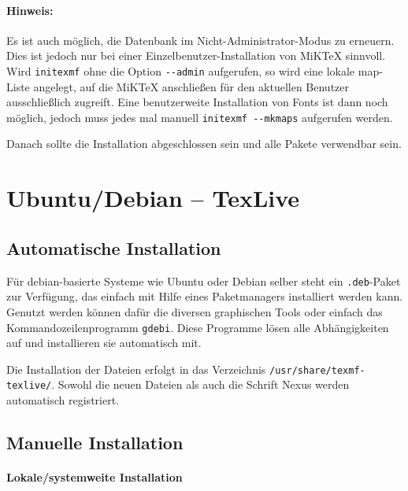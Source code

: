 \begin{description}
\begin{enumerate}
        \paragraph{Hinweis:} Es ist auch möglich, die Datenbank im 
          Nicht-Administrator-Modus zu erneu\-ern. Dies ist jedoch nur bei einer
          Einzelbenutzer-Installation von MiKTeX sinnvoll. Wird
          \lstinline{initexmf} ohne die Option \lstinline{--admin} aufgerufen,
          so wird eine lokale map-Liste angelegt, auf die MiKTeX anschließen für
          den aktuellen Benutzer ausschließlich zugreift.
          Eine benutzerweite Installation von Fonts ist dann noch 
          möglich, jedoch muss jedes mal manuell \lstinline{initexmf --mkmaps}
          aufgerufen werden.
    \end{enumerate}

    Danach sollte die Installation abgeschlossen sein und alle Pakete verwendbar 
    sein.
\end{description}


\clearpage
\section{Ubuntu/Debian -- TexLive}

\subsection{Automatische Installation}

Für debian-basierte Systeme wie Ubuntu oder Debian selber steht ein
\texttt{.deb}-Paket zur Verfügung, das einfach mit Hilfe eines Paketmanagers
installiert werden kann.
Genutzt werden können dafür die diversen graphischen Tools oder einfach das
Kommandozeilenprogramm \texttt{gdebi}. Diese Programme lösen alle Abhängigkeiten
auf und installieren sie automatisch mit.

Die Installation der Dateien erfolgt in das Verzeichnis
\lstinline{/usr/share/texmf-texlive/}. Sowohl die neuen Dateien als auch 
die Schrift Nexus werden automatisch registriert.

\subsection{Manuelle Installation}

\paragraph{Lokale/systemweite Installation}

